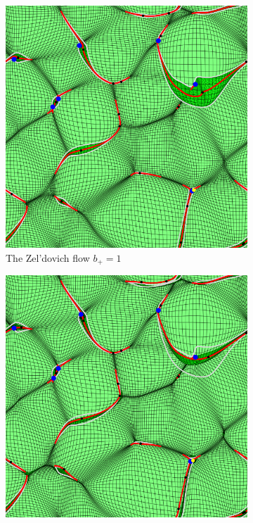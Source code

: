 \documentclass[a4paper, 11pt]{article}
\begin{document}
\begin{figure}
\centering
\begin{subfigure}[b]{0.32\textwidth}
\includegraphics[width=\textwidth]{Visual_Zeldovich_D=1}
\caption{The Zel'dovich flow $b_+=1$}
\end{subfigure}
\begin{subfigure}[b]{0.32\textwidth}
\includegraphics[width=\textwidth]{Visual_Scotch_D=1}

\end{subfigure}
\end{figure}
\end{document}
